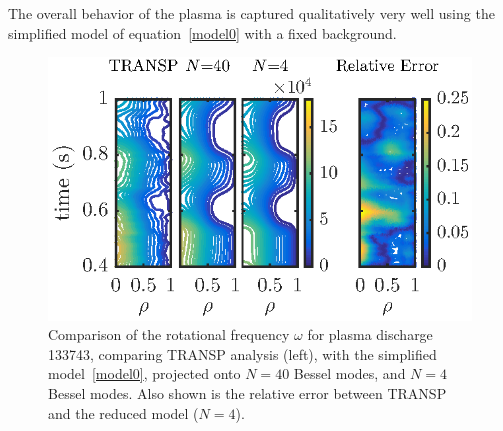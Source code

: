\documentclass{iopart}
\begin{document}
The overall behavior of the plasma is captured qualitatively very well using the simplified model of equation~\eqref{model0} with a fixed background. 

\begin{figure}
\includegraphics{imene_figs/fig9}
\caption{Comparison of the rotational frequency $\omega$ for plasma discharge 133743, comparing TRANSP analysis (left), with the simplified model~\eqref{model0}, projected onto $N=40$ Bessel modes, and $N=4$ Bessel modes.  Also shown is the relative error between TRANSP and the reduced model ($N=4$).}
\label{fig10}
\end{figure}
\end{document}
